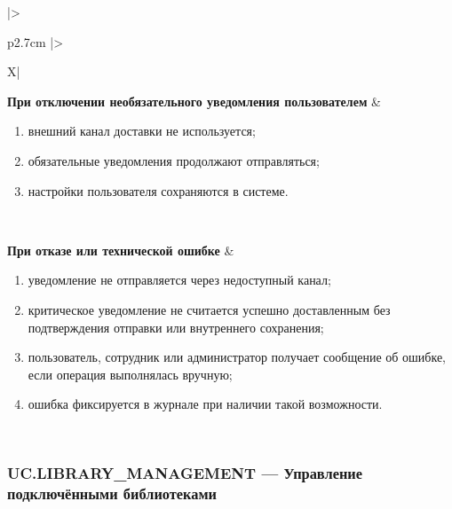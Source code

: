 \documentclass[12pt,a4paper]{article}
\begin{document}
\begin{xltabular}{\textwidth}{
				|>{\raggedright\arraybackslash}p{2.7cm}
				|>{\raggedright\arraybackslash}X|
			}
			\textbf{При отключении необязательного уведомления пользователем} &
			\begin{enumerate}
				\item внешний канал доставки не используется;
				\item обязательные уведомления продолжают отправляться;
				\item настройки пользователя сохраняются в системе.
			\end{enumerate} \\
			\hline
			
			\textbf{При отказе или технической ошибке} &
			\begin{enumerate}
				\item уведомление не отправляется через недоступный канал;
				\item критическое уведомление не считается успешно доставленным без
				подтверждения отправки или внутреннего сохранения;
				\item пользователь, сотрудник или администратор получает сообщение об
				ошибке, если операция выполнялась вручную;
				\item ошибка фиксируется в журнале при наличии такой возможности.
			\end{enumerate} \\
			\hline
			
		\end{xltabular}
		
		\label{tab:uc-notification-specification}
		\clearpage
		
		\subsubsection{UC.LIBRARY\_MANAGEMENT --- Управление подключёнными библиотеками}
		
\end{document}
